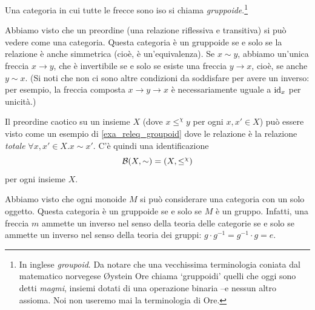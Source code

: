 \begin{definition}[Gruppoide]\label{def_gruppoide}
 Una categoria in cui tutte le frecce sono iso si chiama \emph{gruppoide}.\footnote{In inglese \emph{groupoid}. Da notare che una vecchissima terminologia coniata dal matematico norvegese Øystein Ore chiama `gruppoidi' quelli che oggi sono detti \emph{magmi}, insiemi dotati di una operazione binaria --e nessun altro assioma. Noi non useremo mai la terminologia di Ore.}
\end{definition}
\begin{example}\label{exa_releq_groupoid}
 Abbiamo visto che un preordine (una relazione riflessiva e transitiva) si può vedere come una categoria. Questa categoria è un gruppoide se e solo se la relazione è anche simmetrica (cioè, è un'equivalenza). Se \(x\sim y\), abbiamo un'unica freccia \(x\to y\), che è invertibile se e solo se esiste una freccia \(y\to x\), cioè, se anche \(y\sim x\). (Si noti che non ci sono altre condizioni da soddisfare per avere un inverso: per esempio, la freccia composta \(x\to y\to x\) è necessariamente uguale a \(\mathrm{id}_x\) per unicità.)
\end{example}
\begin{remark}
 Il preordine caotico su un insieme \(X\) (dove \(x\mathrel{\le^\chi} y\) per ogni \(x,x'\in X\)) può essere visto come un esempio di \ref{exa_releq_groupoid} dove le relazione è la relazione \emph{totale} \(\forall x,x'\in X.x\sim x'\). C'è quindi una identificazione
 \[\mathcal{B}(X,\sim) = (X,\le^\chi)\]
 per ogni insieme \(X\).
\end{remark}
\begin{example}\label{exa_grp_groupoid}
 Abbiamo visto che ogni monoide \(M\) si può considerare una categoria con un solo oggetto. Questa categoria è un gruppoide se e solo se \(M\) è un gruppo. Infatti, una freccia \(m\) ammette un inverso nel senso della teoria delle categorie se e solo se ammette un inverso nel senso della teoria dei gruppi: \(g\cdot g^{-1}=g^{-1}\cdot g = e\).
\end{example}
